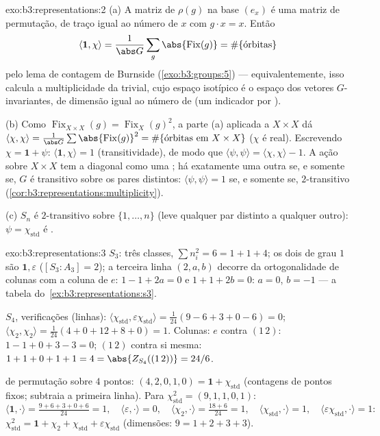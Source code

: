 \begin{solution}{exo:b3:representations:2}
(a) A matriz de $\rho(g)$ na base $(e_x)$ é uma matriz de
permutação, de traço igual ao número de $x$ com $g\cdot x =
x$. Então
\[
\langle\mathbf 1, \chi\rangle = \frac1{\abs G}\sum_g
\abs{\operatorname{Fix}(g)} = \#\{\text{órbitas}\}
\]
pelo lema de contagem de Burnside (\cref{exo:b3:groups:5}) ---
equivalentemente, isso calcula a multiplicidade da 
trivial, cujo espaço isotípico é o espaço dos vetores
$G$-invariantes, de dimensão igual ao número de  (um
indicador por ).

(b) Como $\operatorname{Fix}_{X\times X}(g) =
\operatorname{Fix}_X(g)^2$, a parte (a) aplicada a $X \times X$
dá $\langle\chi,\chi\rangle = \frac1{\abs
G}\sum\abs{\operatorname{Fix}(g)}^2 = \#\{\text{órbitas em }
X\times X\}$ ($\chi$ é real). Escrevendo $\chi = \mathbf 1 +
\psi$: $\langle\mathbf1,\chi\rangle = 1$ (transitividade), de modo que
$\langle\psi,\psi\rangle = \langle\chi,\chi\rangle - 1$. A
ação sobre $X\times X$ tem a diagonal como uma ; há
exatamente uma outra  se, e somente se, $G$ é transitivo sobre os pares distintos:
$\langle\psi,\psi\rangle = 1$ se, e somente se, $2$-transitivo
(\cref{cor:b3:representations:multiplicity}).

(c) $S_n$ é $2$-transitivo sobre $\{1,\dots,n\}$ (leve qualquer
par distinto a qualquer outro): $\psi = \chi_{\mathrm{std}}$ é
.
\end{solution}

\begin{solution}{exo:b3:representations:3}
$S_3$: três classes, $\sum n_i^2 = 6 = 1 + 1 + 4$; os dois
 de grau $1$ são $\mathbf 1, \varepsilon$ ($[S_3 :
A_3] = 2$); a terceira linha $(2, a, b)$ decorre da
ortogonalidade de colunas com a coluna de $e$: $1 - 1 + 2a = 0$ e $1 + 1 +
2b = 0$: $a = 0$, $b = -1$ --- a tabela do~\cref{ex:b3:representations:s3}.

$S_4$, verificações (linhas): $\langle\chi_{\mathrm{std}},
\varepsilon\chi_{\mathrm{std}}\rangle = \frac1{24}(9 - 6 + 3 + 0
- 6) = 0$; $\langle\chi_2,\chi_2\rangle = \frac1{24}(4 + 0 + 12
+ 8 + 0) = 1$. Colunas: $e$ contra $(1\,2)$: $1 - 1 + 0 + 3 - 3
= 0$; $(1\,2)$ contra si mesma: $1 + 1 + 0 + 1 + 1 = 4 =
\abs{Z_{S_4}((1\,2))} = 24/6$.

 de permutação sobre $4$ pontos: $(4, 2, 0, 1, 0) = \mathbf
1 + \chi_{\mathrm{std}}$ (contagens de pontos fixos; subtraia a primeira
linha). Para $\chi_{\mathrm{std}}^2 = (9, 1, 1, 0, 1)$:
\[
\langle\mathbf1,\cdot\rangle = \tfrac{9 + 6 + 3 + 0 + 6}{24} =
1,\quad
\langle\varepsilon,\cdot\rangle = 0,\quad
\langle\chi_2,\cdot\rangle = \tfrac{18 + 6}{24} = 1,\quad
\langle\chi_{\mathrm{std}},\cdot\rangle = 1,\quad
\langle\varepsilon\chi_{\mathrm{std}},\cdot\rangle = 1:
\]
$\chi_{\mathrm{std}}^2 = \mathbf 1 + \chi_2 +
\chi_{\mathrm{std}} + \varepsilon\chi_{\mathrm{std}}$
(dimensões: $9 = 1 + 2 + 3 + 3$).
\end{solution}

